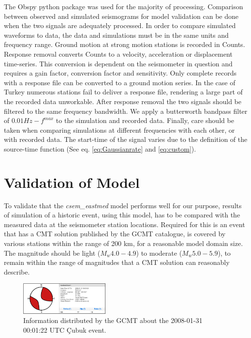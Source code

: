 \documentclass[../Text/00main.tex]{subfiles}
\begin{document}
The Obspy python package was used for the majority of processing. Comparison between observed and simulated seismograms for model validation can be done when the two signals are adequately processed. In order to compare simulated waveforms to data, the data and simulations must be in the same units and frequency range. Ground motion at strong motion stations is recorded in Counts. Response removal converts Counts to a velocity, acceleration or displacement time-series. This conversion is dependent on the seismometer in question and requires a gain factor, conversion factor and sensitivity. Only complete records with a response file can be converted to a ground motion series. In the case of Turkey numerous stations fail to deliver a response file, rendering a large part of the recorded data unworkable. After response removal the two signals should be filtered to the same frequency bandwidth. We apply a butterworth bandpass filter of $0.01 Hz - f^{max}$ to the simulation and recorded data. Finally, care should be taken when comparing simulations at different frequencies with each other, or with recorded data. The start-time of the signal varies due to the definition of the source-time function (See eq. \ref{eq:Gaussianrate} and \ref{eq:custom}). 

\section{Validation of Model}

To validate that the \textit{csem\_eastmed} model performs well for our purpose, results of simulation of a historic event, using this model, has to be compared with the measured data at the seismometer station locations. Required for this is an event that has a CMT solution published by the GCMT catalogue, is covered by various stations within the range of 200 km, for a reasonable model domain size. The magnitude should be light ($M_w 4.0-4.9$) to moderate ($M_w 5.0-5.9$), to remain within the range of magnitudes that a CMT solution can reasonably describe. 

\begin{figure}
    \centering
    \includegraphics[width=0.4\textwidth]{images_methods/infocubuk.png}
    \caption{Information distributed by the GCMT about the 2008-01-31 00:01:22 UTC Çubuk event.}
    \label{fig:cubukeventinfo}
\end{figure}
\end{document}
